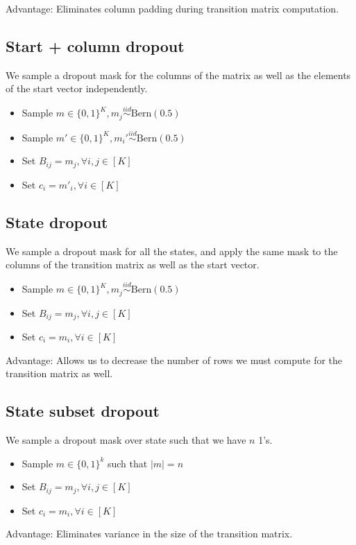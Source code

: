\documentclass[12pt]{article}
\begin{document}
Advantage: Eliminates column padding during transition matrix computation.

\subsection*{Start + column dropout}
We sample a dropout mask for the columns of the matrix as well as the elements of the start vector independently.
\begin{itemize}
\item Sample $m \in\{0,1\}^K, m_j \overset{iid}{\sim} \textrm{Bern}(0.5)$
\item Sample $m' \in\{0,1\}^K, m_i' \overset{iid}{\sim} \textrm{Bern}(0.5)$
\item Set $B_{i j} = m_j, \forall i,j \in [K]$
\item Set $c_{i} = m'_i, \forall i \in [K]$
\end{itemize}

\subsection*{State dropout}
We sample a dropout mask for all the states, and apply the same mask
to the columns of the transition matrix as well as the start vector.
\begin{itemize}
\item Sample $m \in\{0,1\}^K, m_j \overset{iid}{\sim} \textrm{Bern}(0.5)$
\item Set $B_{ij} = m_j, \forall i,j \in [K]$
\item Set $c_{i} = m_i, \forall i \in [K]$
\end{itemize}

Advantage: Allows us to decrease the number of rows we must compute
for the transition matrix as well.

\subsection*{State subset dropout}
We sample a dropout mask over state such that we have $n$ 1's.
\begin{itemize}
\item Sample $m \in \{0,1\}^k$ such that $|m| = n$
\item Set $B_{ij} = m_j, \forall i,j \in [K]$
\item Set $c_{i} = m_i, \forall i \in [K]$
\end{itemize}

Advantage: Eliminates variance in the size of the transition matrix.
\end{document}
